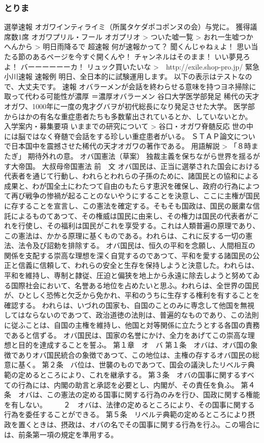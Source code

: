 \subsubsection{とりま}
選挙速報 オガワインティライミ（所属タケダポコポンヌの会）与党に。 獲得議席数1席 オガワプリル・フール オガプリオ > ついた嘘一覧 > おれ一生嘘つかへんから > 明日雨降るで 超速報 何が速報かって？ 聞くんじゃねぇよ！ 思い当たる節のあるページを今すぐ開くんや！ チャンネルはそのまま！ いい夢見ろよ！ バーーーーーーカ！ リュック買いたいな >　http://exile.shop-pro.jp/ 緊急小川速報 速報例 明日、全日本的に試験運用します。 以下の表示はテストなので、大丈夫です。 速報 オバラーメンが会話を終わらせる意味を持つヨネ掃除に取って代わる可能性が濃厚 ＝濃厚オバラーメン 谷口大学医学部発足 稀代の天才オガワ、1000年に一度の鬼才グバヲが初代総長になり発足させた大学。 医学部からはかの有名な重症患者たちも多数輩出されているとか、していないとか。 入学案内・募集要項 いままでの研究について > 谷口・オガワ脊髄反応 世の中には脳ではなく脊髄で会話をする珍しい重症患者がいる。 ＳＴＡＰ論文についで日本国中を震撼させた稀代の天才オガワの著作である。 用語解説 > 「８時またぎ」 期待外れの意。 オバ国憲法（草案） 独裁主義を保ちながら世界を揺るがす大帝国。 大叔母帝国憲法 前　文 オバ国民は、正当に選挙された国会における代表者を通じて行動し、われらとわれらの子孫のために、諸国民との協和による成果と、わが国全土にわたつて自由のもたらす恵沢を確保し、政府の行為によつて再び戦争の惨禍が起ることのないやうにすることを決意し、ここに主権が国民に存することを宣言し、この憲法を確定する。そもそも国政は、国民の厳粛な信託によるものてあつて、その権威は国民に由来し、その権力は国民の代表者がこれを行使し、その福利は国民がこれを享受する。これは人類普遍の原理であり、この憲法は、かかる原理に基くものである。われらは、これに反する一切の憲法、法令及び詔勅を排除する。 オバ国民は、恒久の平和を念願し、人間相互の関係を支配する崇高な理想を深く自覚するのであつて、平和を愛する諸国民の公正と信義に信頼して、われらの安全と生存を保持しようと決意した。われらは、平和を維持し、専制と隷従、圧迫と偏狭を地上から永遠に除去しようと努めてゐる国際社会において、名誉ある地位を占めたいと思ふ。われらは、全世界の国民が、ひとしく恐怖と欠乏から免かれ、平和のうちに生存する権利を有することを確認する。 われらは、いづれの国家も、自国のことのみに専念して他国を無視してはならないのであつて、政治道徳の法則は、普遍的なものであり、この法則に従ふことは、自国の主権を維持し、他国と対等関係に立たうとする各国の責務であると信ずる。 オバ国民は、国家の名誉にかけ、全力をあげてこの崇高な理想と目的を達成することを誓ふ。 第１章　オ　バ 第１条　オバは、オバ国の象徴でありオバ国民統合の象徴であつて、この地位は、主権の存するオバ国民の総意に基く。 第２条　バ位は、世襲のものであつて、国会の議決したリベルテ典範の定めるところにより、これを継承する。 第３条　オバの国事に関するすべての行為には、内閣の助言と承認を必要とし、内閣が、その責任を負ふ。 第４条　オバは、この憲法の定める国事に関する行為のみを行ひ、国政に関する権能を有しない。 　　２　オバは、法律の定めるところにより、その国事に関する行為を委任することができる。 第５条　リベルテ典範の定めるところにより摂政を置くときは、摂政は、オバの名でその国事に関する行為を行ふ。この場合には、前条第一項の規定を準用する。 